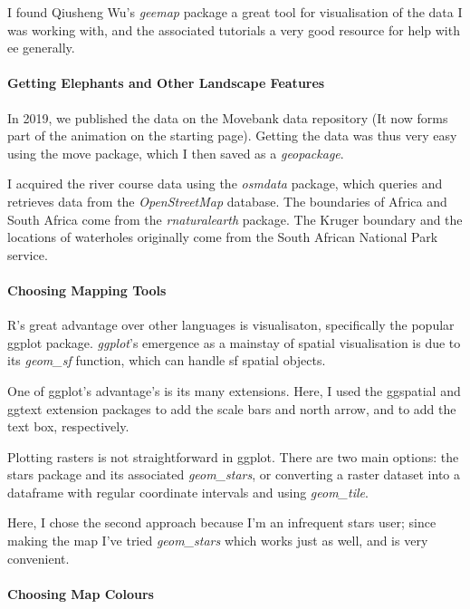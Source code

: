 	I found Qiusheng Wu's \textit{geemap} package a great tool for visualisation of the data I was working with, and the associated tutorials a very good resource for help with ee generally.

	\paragraph*{Getting Elephants and Other Landscape Features}

	In 2019, we published the data on the Movebank data repository (It now forms part of the animation on the starting page). Getting the data was thus very easy using the move package, which I then saved as a \textit{geopackage}.

	I acquired the river course data using the \textit{osmdata} package, which queries and retrieves data from the \textit{OpenStreetMap} database. The boundaries of Africa and South Africa come from the \textit{rnaturalearth} package. The Kruger boundary and the locations of waterholes originally come from the South African National Park service.

	\paragraph*{Choosing Mapping Tools}

	R's great advantage over other languages is visualisaton, specifically the popular ggplot package. \textit{ggplot}'s emergence as a mainstay of spatial visualisation is due to its \textit{geom\_sf} function, which can handle sf spatial objects.
	
	One of ggplot's advantage's is its many extensions. Here, I used the ggspatial and ggtext extension packages to add the scale bars and north arrow, and to add the text box, respectively.
	
	Plotting rasters is not straightforward in ggplot. There are two main options: the stars package and its associated \textit{geom\_stars}, or converting a raster dataset into a dataframe with regular coordinate intervals and using \textit{geom\_tile}.
	
	Here, I chose the second approach because I'm an infrequent stars user; since making the map I've tried \textit{geom\_stars} which works just as well, and is very convenient.

	\paragraph*{Choosing Map Colours}


